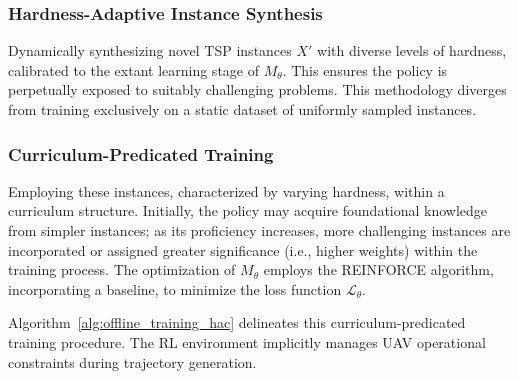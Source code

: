 \documentclass[10pt,conference,letterpaper]{IEEEtran}
\begin{document}
\subsubsection{Hardness-Adaptive Instance Synthesis} Dynamically synthesizing novel TSP instances $X'$ with diverse levels of hardness, calibrated to the extant learning stage of $M_{\theta}$. This ensures the policy is perpetually exposed to suitably challenging problems. This methodology diverges from training exclusively on a static dataset of uniformly sampled instances.

\subsubsection{Curriculum-Predicated Training} Employing these instances, characterized by varying hardness, within a curriculum structure. Initially, the policy may acquire foundational knowledge from simpler instances; as its proficiency increases, more challenging instances are incorporated or assigned greater significance (i.e., higher weights) within the training process. The optimization of $M_{\theta}$ employs the REINFORCE algorithm, incorporating a baseline, to minimize the loss function $\mathcal{L}_{\theta}$.

Algorithm~\ref{alg:offline_training_hac} delineates this curriculum-predicated training procedure. The RL environment implicitly manages UAV operational constraints during trajectory generation.
\end{document}
